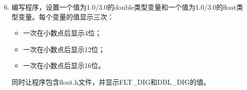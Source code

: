 \documentclass[12pt,notheorems]{beamer}
\begin{document}
\begin{frame} 

\end{frame}

\begin{frame}[fragile] 
\begin{enumerate}\setcounter{enumi}{5} 
\item 编写程序，设置一个值为1.0/3.0的double类型变量和一个值为1.0/3.0的float类型变量。每个变量的值显示三次：\\[0.05in]
\begin{itemize}
\item 一次在小数点后显示4位；\\[0.1in]
\item 一次在小数点后显示12位；\\[0.1in]
\item 一次在小数点后显示16位。\\[0.05in]
\end{itemize}
同时让程序包含float.h文件，并显示FLT\_DIG和DBL\_DIG的值。
\end{enumerate}
\end{frame}

\begin{frame} 

\end{frame}
\end{document}

